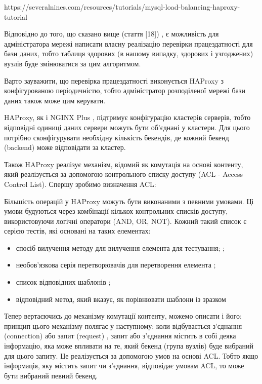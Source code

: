 \documentclass[14pt]{vakthesis}
\begin{document}
https://severalnines.com/resources/tutorials/mysql-load-balancing-haproxy-tutorial

Відповідно до того, що сказано вище (стаття [18]) , є можливість для адміністратора мережі написати власну реалізацію перевірки працездатності для бази даних, тобто таблиця здорових (в нашому випадку, здорових і узгоджених) вузлів буде змінюватися за цим алгоритмом. 

Варто зауважити, що перевірка працездатності виконується HAProxy з конфігурованою періодичністю, 
тобто адміністратор розподіленої мережі бази даних також може цим керувати.


HAProxy, як і NGINX Plus , підтримує конфігурацію кластерів серверів, тобто відповідні одиниці даних сервери можуть бути об'єднані у кластери. 
Для цього потрібно сконфігурувати необхідну кількість бекендів, де кожний бекенд (backend) може відповідати за кластер. 

Також HAProxy реалізує механізм, відомий як комутація на основі контенту, який реалізується за 
допомогою контрольного списку доступу (ACL - Access Control List).
Спершу зробимо визначення ACL:

Більшість операцій у HAProxy можуть бути виконаними з певними умовами. Ці умови будуються через комбінації кількох контрольних списків доступу, використовуючи логічні оператори (AND, OR, NOT). Кожний такий список є серією тестів, які основані на таких елементах:

\begin{itemize}

\item спосіб вилучення методу для вилучення елемента для тестування; ;

\item необов'язкова серія перетворювачів для перетворення елемента ;

\item список відповідних шаблонів ;

\item відповідний метод, який вказує, як порівнювати шаблони із зразком

\end{itemize}

Тепер вертаєючись до механізму комутації контенту, можемо описати і його: принцип цього механізму полягає у наступному: 
коли відбувається з'єднання (connection) або запит (request) , запит або з'єднання містить в собі деяка інформацію, яка може впливати на те, який бекенд (група вузлів) буде вибраний для цього запиту. Це реалізується за допомогою умов на основі ACL. Тобто якщо інформація, яку містить запит чи з'єднання, відповідає умовам ACL, то може бути вибраний певний бекенд.
\end{document}
